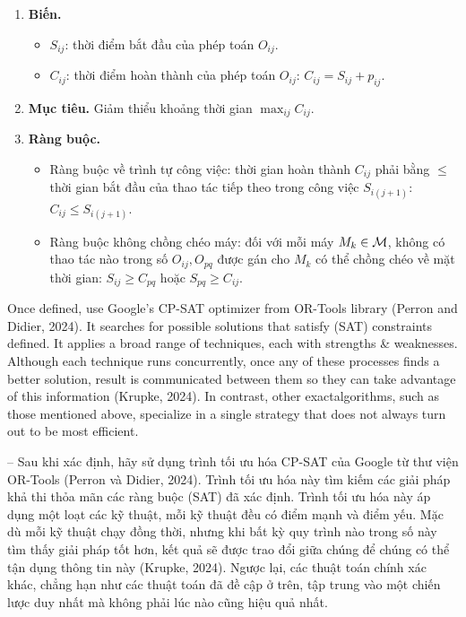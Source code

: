 \documentclass{article}
\begin{document}
\begin{itemize}
\begin{itemize}
\begin{itemize}
            \begin{enumerate}
                \item {\bf Biến.}
                \begin{itemize}
                    \item $S_{ij}$: thời điểm bắt đầu của phép toán $O_{ij}$.
                    \item $C_{ij}$: thời điểm hoàn thành của phép toán $O_{ij}$: $C_{ij} = S_{ij} + p_{ij}$.
                \end{itemize}
                \item {\bf Mục tiêu.} Giảm thiểu khoảng thời gian $\max_{ij} C_{ij}$.
                \item {\bf Ràng buộc.}
                \begin{itemize}
                    \item Ràng buộc về trình tự công việc: thời gian hoàn thành $C_{ij}$ phải bằng $\le$ thời gian bắt đầu của thao tác tiếp theo trong công việc $S_{i(j + 1)}$: $C_{ij}\le S_{i(j + 1)}$.
                    \item Ràng buộc không chồng chéo máy: đối với mỗi máy $M_k\in{\cal M}$, không có thao tác nào trong số $O_{ij}, O_{pq}$ được gán cho $M_k$ có thể chồng chéo về mặt thời gian: $S_{ij}\ge C_{pq}$ hoặc $S_{pq}\ge C_{ij}$.
                \end{itemize}
            \end{enumerate}
            Once defined, use Google's CP-SAT optimizer from OR-Tools library (Perron and Didier, 2024). It searches for possible solutions that satisfy (SAT) constraints defined. It applies a broad range of techniques, each with strengths \& weaknesses. Although each technique runs concurrently, once any of these processes finds a better solution, result is communicated between  them so they can take advantage of this information (Krupke, 2024). In contrast, other exactalgorithms, such as those mentioned above, specialize in a single strategy that does not always turn out to be most efficient.

            -- Sau khi xác định, hãy sử dụng trình tối ưu hóa CP-SAT của Google từ thư viện OR-Tools (Perron và Didier, 2024). Trình tối ưu hóa này tìm kiếm các giải pháp khả thi thỏa mãn các ràng buộc (SAT) đã xác định. Trình tối ưu hóa này áp dụng một loạt các kỹ thuật, mỗi kỹ thuật đều có điểm mạnh và điểm yếu. Mặc dù mỗi kỹ thuật chạy đồng thời, nhưng khi bất kỳ quy trình nào trong số này tìm thấy giải pháp tốt hơn, kết quả sẽ được trao đổi giữa chúng để chúng có thể tận dụng thông tin này (Krupke, 2024). Ngược lại, các thuật toán chính xác khác, chẳng hạn như các thuật toán đã đề cập ở trên, tập trung vào một chiến lược duy nhất mà không phải lúc nào cũng hiệu quả nhất.


\end{itemize}
\end{itemize}
\end{itemize}
\end{document}
